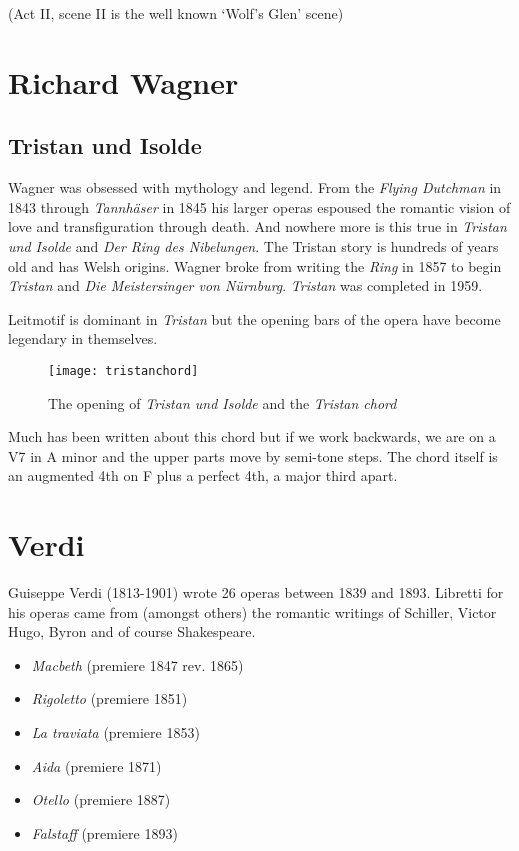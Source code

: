 (Act II, scene II is the well known `Wolf's Glen' scene)

\section{Richard Wagner}
\subsection{Tristan und Isolde} 
Wagner was obsessed with mythology and legend. From the \textit{Flying Dutchman} in 1843 through \textit{Tannh\"aser} in 1845 his larger operas espoused the romantic vision of love and transfiguration through death. And nowhere more is this true in \textit{Tristan und Isolde} and \textit{Der Ring des Nibelungen}. The Tristan story is hundreds of years old and has Welsh origins. Wagner broke from writing the \textit{Ring} in 1857 to begin \textit{Tristan} and \textit{Die Meistersinger von N\"urnburg}. \textit{Tristan} was completed in 1959. 

Leitmotif is dominant in \textit{Tristan} but the opening bars of the opera have become legendary in themselves.

\begin{figure}[H]
\centering
\texttt{[image: tristanchord]}\caption{The opening of \textit{Tristan und Isolde} and the \textit{Tristan chord}}
\label{fig:tristanchord}
\end{figure}

Much has been written about this chord but if we work backwards, we are on a V7 in A minor and the upper parts move by semi-tone steps. The chord itself is an augmented 4th on F plus a perfect 4th, a major third apart.   

\section{Verdi}
Guiseppe Verdi (1813-1901) wrote 26 operas between 1839 and 1893. Libretti for his operas came from (amongst others) the romantic writings of Schiller, Victor Hugo, Byron and of course Shakespeare. 

\begin{itemize}
\item \textit{Macbeth} (premiere 1847 rev. 1865)
\item \textit{Rigoletto} (premiere 1851)
\item \textit{La traviata} (premiere 1853)
\item \textit{Aida} (premiere 1871)
\item \textit{Otello} (premiere 1887)
\item \textit{Falstaff} (premiere 1893)
\end{itemize}



